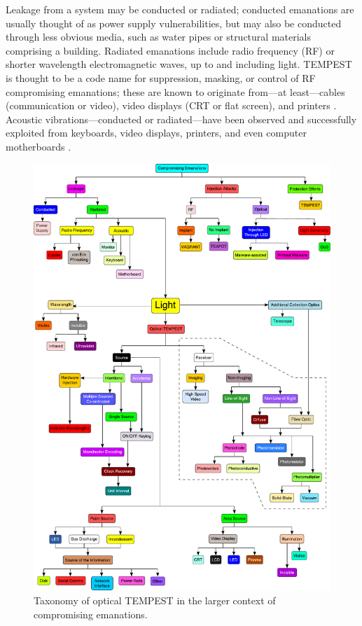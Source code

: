 \documentclass[a4paper,twoside,11pt]{book}
\begin{document}
Leakage from a system may be conducted or radiated; conducted emanations are
usually thought of as power supply vulnerabilities, but may also be conducted
through less obvious media, such as water pipes or structural materials
comprising a building. Radiated emanations include radio frequency (RF) or
shorter wavelength electromagnetic waves, up to and including light. TEMPEST is
thought to be a code name for suppression, masking, or control of RF
compromising emanations; these are known to originate from---at least---cables
(communication or video), video displays (CRT or flat screen), and printers
\cite{vanEck1985,Smulders1990,Kuhn2002,Grzesiak2010a}. Acoustic
vibrations---conducted or radiated---have been observed and successfully
exploited from keyboards, video displays, printers, and even computer
motherboards \cite{Wright1987,Asonov2004,Zhuang2005,Berger2006,Backes2010,
Genkin2013,Genkin2018a,Kubiak2018f}.

\begin{figure}[htp]
  \centering
  \includegraphics[width=\textwidth]{taxonomy.pdf}
  \caption{Taxonomy of optical TEMPEST in the larger context of compromising
    emanations.}
  \label{figure:taxonomy}
\end{figure}
\end{document}
